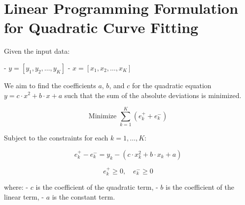 \documentclass{article}
\begin{document}
\section*{Linear Programming Formulation for Quadratic Curve Fitting}

Given the input data:

- \( y = [y_1, y_2, \ldots, y_K] \)
- \( x = [x_1, x_2, \ldots, x_K] \)

We aim to find the coefficients \(a\), \(b\), and \(c\) for the quadratic equation \(y = c \cdot x^2 + b \cdot x + a\) such that the sum of the absolute deviations is minimized.

\[
\text{Minimize } \sum_{k=1}^{K} (e_k^+ + e_k^-)
\]

Subject to the constraints for each \(k = 1, \ldots, K\):

\[
e_k^+ - e_k^- = y_k - (c \cdot x_k^2 + b \cdot x_k + a)
\]

\[
e_k^+ \geq 0, \quad e_k^- \geq 0
\]

where:
- \(c\) is the coefficient of the quadratic term,
- \(b\) is the coefficient of the linear term,
- \(a\) is the constant term.
\end{document}
